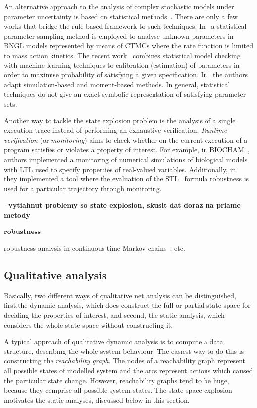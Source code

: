 \documentclass[11pt,a4paper]{report}
\begin{document}
An alternative approach to the analysis of complex stochastic models under
parameter uncertainty is based on statistical methods~\cite{Luck2016,BackenkohlerBW18,Bortolussi2016,Bortolussi2018}. There are only a few works that bridge the rule-based framework to such techniques. In~\cite{liu2016parameter} a statistical parameter sampling method is employed to analyse unknown parameters in BNGL models represented by means of CTMCs where the rate function is limited to mass action kinetics. The recent work~\cite{KJ18} combines statistical model checking with machine learning techniques to calibration (estimation) of parameters in order to maximise probability of satisfying a given specification. In~\cite{Bock15} the authors adapt simulation-based and moment-based methods. In general, statistical techniques do not give an exact symbolic representation of satisfying parameter sets. 

Another way to tackle the state explosion problem is the analysis of a single execution trace instead of performing an exhaustive verification. \emph{Runtime verification} (or \emph{monitoring}) aims to check whether on the current execution of a program satisfies or violates a property of interest. For example, in BIOCHAM~\cite{calzone2006biocham}, authors implemented a monitoring of numerical simulations of biological models with LTL used to specify properties of real-valued variables. Additionally, in~\cite{donze2010breach} they implemented a tool where the evaluation of the STL~\cite{maler2004monitoring} formula robustness is used for a particular trajectory through monitoring.

- \textbf{vytiahnut problemy so state explosion, skusit dat doraz na priame metody}

\textbf{robustness}

robustness analysis in continuous-time Markov chains~\cite{vceska2014robustness};  etc.

\subsection{Qualitative analysis}

Basically, two different ways of qualitative net analysis can be distinguished, first,the dynamic analysis, which does construct the full or partial state space for
deciding the properties of interest, and second, the static analysis, which considers the whole state space without constructing it.

A typical approach of qualitative dynamic analysis is to compute a data structure, describing the whole system behaviour. The easiest way to do this is constructing the \emph{reachability graph}. The nodes of a reachability graph represent all possible states of modelled system and the arcs represent actions which caused the particular state change. However, reachability graphs tend to be huge, because they comprise all possible system states. The state space explosion motivates the static analyses, discussed below in this section. 
\end{document}
